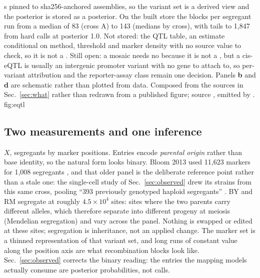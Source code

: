 {  s pinned to sha256-anchored assemblies, so the variant set is a
  derived view and the posterior is stored as a posterior. On the built store the blocks per
  segregant run from a median of 83 (cross A) to 143 (medians by cross), with tails to
  1,847 from hard calls at posterior 1.0. Not stored: the QTL table, an estimate
  conditional on method, threshold and marker density with no source value to check, so
  it is not a . Still open: a mosaic needs no 
  because it is not a , but a cis-eQTL is usually an intergenic
  promoter variant with no gene to attach to, so per-variant attribution and the
  reporter-assay class remain one decision.
  Panels \textbf{b} and \textbf{d} are schematic rather than plotted from data. Composed
  from the sources in Sec.~\ref{sec:what} rather than redrawn from a published figure;
  source ,
  emitted by .}
  {fig:eqtl}

\subsection{Two measurements and one inference}\label{sec:tables}

 $X$, segregants by marker positions. Entries encode
\emph{parental origin} rather than base identity, so the natural form looks binary. Bloom
2013 used 11,623 markers for 1,008 segregants \citep{bloomFindingSourcesMissing2013}, and
that older panel is the deliberate reference point rather than a stale one: the
single-cell study of Sec.~\ref{sec:observed} drew its strains from this same cross,
pooling ``393 previously genotyped haploid segregants''
\citep{boocockSinglecellEQTLMapping2025}. BY and RM segregate at roughly
$4.5\times10^{4}$ sites: sites where the two parents carry different alleles, which
therefore separate into different progeny at meiosis (Mendelian segregation) and vary
across the panel. Nothing is swapped or edited at these sites; segregation is inheritance,
not an applied change. The marker set is a thinned representation of that variant
set, and long runs of constant value along the position axis are what recombination blocks
look like. Sec.~\ref{sec:observed} corrects the binary reading: the entries the mapping
models actually consume are posterior probabilities, not calls.

